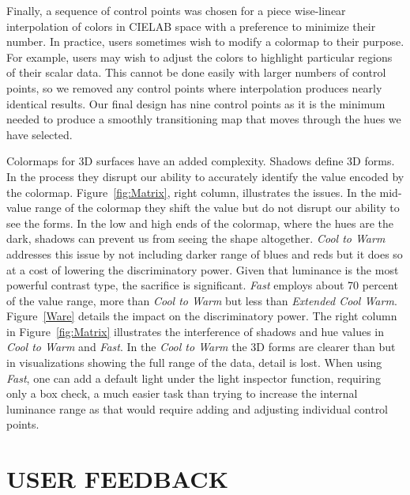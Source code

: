 \documentclass{IEEEcsmag}
\newcommand*{\colormap}[1]{\textsl{#1}\xspace}
\newcommand*{\coolwarm}{\colormap{Cool to Warm}}
\newcommand*{\fast}{\colormap{Fast}}
\begin{document}
Finally, a sequence of control points was chosen for a piece wise-linear interpolation of colors in CIELAB space with a preference to minimize their number.
In practice, users sometimes wish to modify a colormap to their purpose.
For example, users may wish to adjust the colors to highlight particular regions of their scalar data.
This cannot be done easily with larger numbers of control points, so we removed any control points where interpolation produces nearly identical results.
Our final design has nine control points as it is the minimum needed to produce a smoothly transitioning map that moves through the hues we have selected.




 Colormaps for 3D surfaces have an added complexity. Shadows define 3D forms. In the process they disrupt our ability to accurately identify the value encoded by the colormap. Figure~\ref{fig:Matrix}, right column, illustrates the issues. In the mid-value range of the colormap they shift the value but do not disrupt our ability to see the forms. In the low and high ends of the colormap, where the hues are the dark, shadows can prevent us from seeing the shape altogether. \coolwarm addresses this issue by not including darker range of blues and reds but it does so at a cost of lowering the discriminatory power. Given that luminance is the most powerful contrast type, the sacrifice is significant. \fast employs about 70 percent of the value range, more than \coolwarm but less than \textit{Extended Cool Warm}. Figure~\ref{Ware} details the impact on the discriminatory power. The right column in Figure~\ref{fig:Matrix} illustrates the interference of shadows and hue values in \coolwarm and \fast. In the \coolwarm the 3D forms are clearer than but in visualizations showing the full range of the data, detail is lost.  When using \fast, one can add a default light under the light inspector function, requiring only a box check, a much easier task than trying to increase the internal luminance range as that would require adding and adjusting individual control points.
 
\section{USER FEEDBACK}
\end{document}
